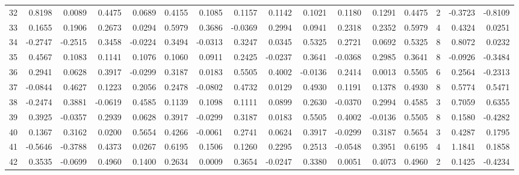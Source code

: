 \begin{tabular}{lrrrrrrrrrrrrrrr}
32  &      0.8198 &  0.0089 &  0.4475 &  0.0689 &  0.4155 &  0.1085 &  0.1157 &  0.1142 &  0.1021 &  0.1180 &   0.1291 &     0.4475 &      2 &                   -0.3723 &                    -0.8109 \\
33  &      0.1655 &  0.1906 &  0.2673 &  0.0294 &  0.5979 &  0.3686 & -0.0369 &  0.2994 &  0.0941 &  0.2318 &   0.2352 &     0.5979 &      4 &                    0.4324 &                     0.0251 \\
34  &     -0.2747 & -0.2515 &  0.3458 & -0.0224 &  0.3494 & -0.0313 &  0.3247 &  0.0345 &  0.5325 &  0.2721 &   0.0692 &     0.5325 &      8 &                    0.8072 &                     0.0232 \\
35  &      0.4567 &  0.1083 &  0.1141 &  0.1076 &  0.1060 &  0.0911 &  0.2425 & -0.0237 &  0.3641 & -0.0368 &   0.2985 &     0.3641 &      8 &                   -0.0926 &                    -0.3484 \\
36  &      0.2941 &  0.0628 &  0.3917 & -0.0299 &  0.3187 &  0.0183 &  0.5505 &  0.4002 & -0.0136 &  0.2414 &   0.0013 &     0.5505 &      6 &                    0.2564 &                    -0.2313 \\
37  &     -0.0844 &  0.4627 &  0.1223 &  0.2056 &  0.2478 & -0.0802 &  0.4732 &  0.0129 &  0.4930 &  0.1191 &   0.1378 &     0.4930 &      8 &                    0.5774 &                     0.5471 \\
38  &     -0.2474 &  0.3881 & -0.0619 &  0.4585 &  0.1139 &  0.1098 &  0.1111 &  0.0899 &  0.2630 & -0.0370 &   0.2994 &     0.4585 &      3 &                    0.7059 &                     0.6355 \\
39  &      0.3925 & -0.0357 &  0.2939 &  0.0628 &  0.3917 & -0.0299 &  0.3187 &  0.0183 &  0.5505 &  0.4002 &  -0.0136 &     0.5505 &      8 &                    0.1580 &                    -0.4282 \\
40  &      0.1367 &  0.3162 &  0.0200 &  0.5654 &  0.4266 & -0.0061 &  0.2741 &  0.0624 &  0.3917 & -0.0299 &   0.3187 &     0.5654 &      3 &                    0.4287 &                     0.1795 \\
41  &     -0.5646 & -0.3788 &  0.4373 &  0.0267 &  0.6195 &  0.1506 &  0.1260 &  0.2295 &  0.2513 & -0.0548 &   0.3951 &     0.6195 &      4 &                    1.1841 &                     0.1858 \\
42  &      0.3535 & -0.0699 &  0.4960 &  0.1400 &  0.2634 &  0.0009 &  0.3654 & -0.0247 &  0.3380 &  0.0051 &   0.4073 &     0.4960 &      2 &                    0.1425 &                    -0.4234 \\

\end{tabular}

